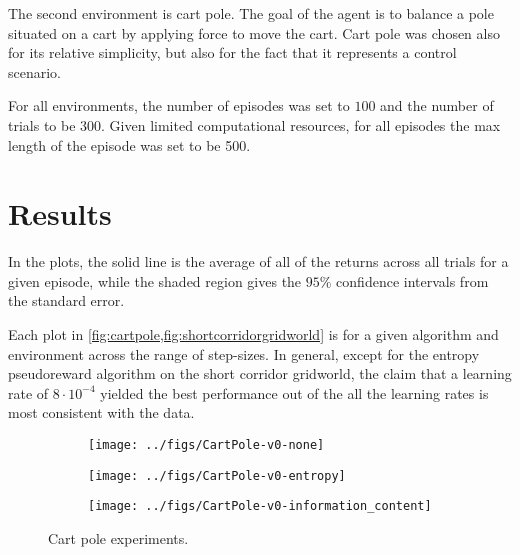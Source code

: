 \documentclass{article}
\begin{document}
  The second environment is cart pole. The goal of the agent is to balance a pole situated on a cart by applying force to move the cart. Cart pole was chosen also for its relative simplicity, but also for the fact that it represents a control scenario.

  For all environments, the number of episodes was set to $100$ and the number of trials to be $300$. Given limited computational resources, for all episodes the max length of the episode was set to be 500.


  \section{Results}
  In the plots, the solid line is the average of all of the returns across all trials for a given episode, while the shaded region gives the $95\%$ confidence intervals from the standard error.

  Each plot in \cref{fig:cartpole,fig:shortcorridorgridworld} is for a given algorithm and environment across the range of step-sizes. In general, except for the entropy pseudoreward algorithm on the short corridor gridworld, the claim that a learning rate of $8 \cdot 10^{-4}$ yielded the best performance out of the all the learning rates is most consistent with the data.

  \begin{figure}
    \begin{subfigure}{\textwidth}
      \centering
      \texttt{[image: ../figs/CartPole-v0-none]}
      \label{fig:cartpole-none}
    \end{subfigure}
    \begin{subfigure}{\textwidth}
      \centering
      \texttt{[image: ../figs/CartPole-v0-entropy]}
      \label{fig:cartpole-entropy}
    \end{subfigure}
    \begin{subfigure}{\textwidth}
      \centering
      \texttt{[image: ../figs/CartPole-v0-information\_content]}
      \label{fig:cartpole-information-content}
    \end{subfigure}
    \caption{Cart pole experiments.}
    \label{fig:cartpole}
  \end{figure}
\end{document}
